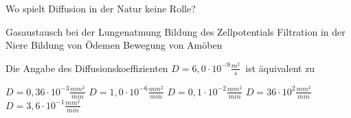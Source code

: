 \documentclass[11pt]{exam}
\begin{document}
\begin{questions}
\vspace{3mm}\question Wo spielt Diffusion in der Natur keine Rolle?

\begin{choices}
	\choice Gasaustausch bei der Lungenatmung
	\choice Bildung des Zellpotentials
	\choice Filtration in der Niere
	\choice Bildung von Ödemen
	\choice Bewegung von Amöben
\end{choices}

\vspace{3mm}\question Die Angabe des Diffusionskoeffizienten \( D={6,0 \cdot 10^{-9}} \frac{m^2}{s} \) ist äquivalent zu

\begin{choices}
	\choice \( D={0,36 \cdot 10^{-3}} \frac{mm^2}{min} \)
	\choice \( D={1,0 \cdot 10^{-6}} \frac{mm^2}{min} \)
	\choice \( D={0,1 \cdot 10^{-2}} \frac{mm^2}{min} \)
	\choice \( D={36 \cdot 10^{2}} \frac{mm^2}{min} \)
	\choice \( D={3,6 \cdot 10^{-1}} \frac{mm^2}{min} \)
\end{choices}

\vspace{3mm}\end{questions}
\end{document}
